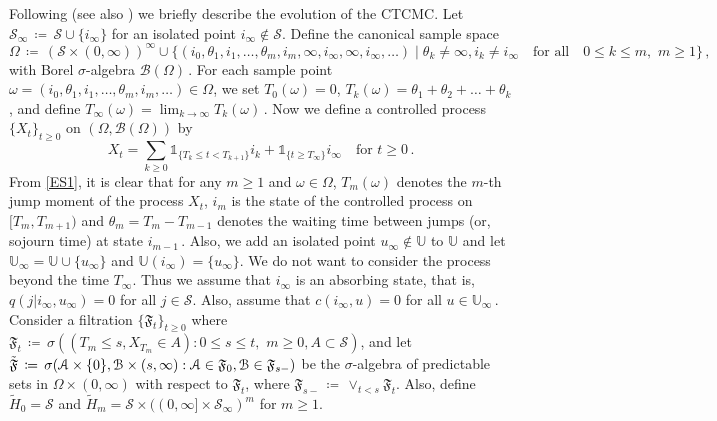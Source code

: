 \documentclass[notitlepage,11pt,reqno]{amsart}
\numberwithin{equation}{section}
\theoremstyle{plain}
\theoremstyle{definition}
\theoremstyle{remark}
\newcommand{\Ind}{\mathds{1}}       %
\newcommand{\Act}{{\mathds{U}}}
\newcommand{\sB}{{\mathscr{B}}}
\newcommand{\cS}{{\mathcal{S}}}     %
\newcommand{\df}{\coloneqq}
\begin{document}
Following \cite{K85} (see also \cite{GL19,GZ19,PZ20}) we briefly describe the evolution of the CTCMC. Let $\cS_{\infty}\,\df\, \cS\cup \{i_{\infty}\}$ for an isolated point $i_{\infty}\notin \cS$. Define the canonical sample space $\Omega \,\df\, (\cS\times (0, \infty))^{\infty}\cup \{(i_0, \theta_1, i_1,\dots,\theta_m,i_m,\infty,i_{\infty},\infty,i_{\infty},\dots)\mid \theta_k \neq \infty, i_k \neq i_{\infty}\quad\text{for all}\quad 0\le k \le m,\,\, m\ge 1\}\,,$ with Borel $\sigma$-algebra $\sB(\Omega)$\,. For each sample point $\omega = (i_0, \theta_1, i_1,\ldots,\theta_m,i_m,\ldots)\in\Omega$, we set $T_0(\omega) = 0$, $T_k(\omega) = \theta_1 + \theta_2 +\dots +\theta_k$, and define $T_{\infty}(\omega) = \lim_{k\to\infty}T_k(\omega)$\,. Now we define a controlled process $\{X_t\}_{t\ge 0}$ on $(\Omega, \sB(\Omega))$ by
\begin{equation}\label{ES1}
X_t = \sum_{k\ge 0} \Ind_{\{T_{k} \le t < T_{k+1}\}}i_k + \Ind_{\{t\ge T_{\infty}\}}i_{\infty}\quad \text{for}\,\, t\ge 0\,.
\end{equation} 
From \cref{ES1}, it is clear that for any $m\ge 1$ and $\omega \in\Omega$, $T_m(\omega)$ denotes the $m$-th jump moment of the process $X_t$, $i_m$ is the state of the controlled process on $[T_m, T_{m+1})$ and $\theta_m = T_m - T_{m-1}$ denotes the waiting time between jumps (or, sojourn time) at state $i_{m-1}$\,. Also, we add an isolated point $u_{\infty}\notin \Act$ to $\Act$ and let $\Act_{\infty} = \Act\cup \{u_{\infty}\}$ and $\Act(i_{\infty}) = \{u_{\infty}\}$. We do not want to consider the process beyond the time $T_{\infty}$. Thus we assume that $i_{\infty}$ is an absorbing state, that is, $q(j|i_{\infty}, u_{\infty}) = 0$ for all $j\in \cS$. Also, assume that $c(i_{\infty}, u) = 0$ for all $u\in\Act_{\infty}$\,. Consider a filtration $\{\mathfrak{F}_{t}\}_{t\ge 0}$ where $\mathfrak{F}_{t} \,\df\, \sigma((T_{m} \le s, X_{T_m}\in A) : 0\le s \le t,\,\, m \ge 0, A\subset \cS)$, and let $\Tilde{\mathfrak{F}} \,\df\, \sigma(\mathcal{A}\times \{0\}, \mathcal{B}\times (s,\infty) : \mathcal{A}\in \mathfrak{F}_0, \mathcal{B}\in\mathfrak{F}_{s-})$ be the $\sigma$-algebra of predictable sets in $\Omega\times(0, \infty)$ with respect to $\mathfrak{F}_{t}$, where $\mathfrak{F}_{s-} \,\df\, \vee_{t < s} \mathfrak{F}_{t}$.  Also, define $\tilde{H}_0=\cS$ and $\tilde{H}_m=\cS\times((0, \infty]\times\cS_\infty)^m$ for $m\geq 1$.
\end{document}
